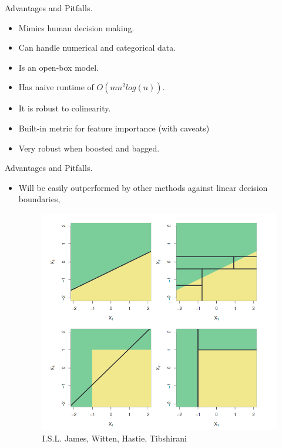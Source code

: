 \documentclass[xcolor={svgnames},
               hyperref={colorlinks,citecolor=DeepPink4,linkcolor=FireBrick,urlcolor=Maroon}]
               {beamer}
\begin{document}
  \begin{frame}{Advantages and Pitfalls.}
    \begin{itemize}
      \item Mimics human decision making. 
      \vfill
      \item Can handle numerical and categorical data.
      \vfill
      \item Is an open-box model.
      \vfill
      \item Has naive runtime of $O(mn^2log(n))$. 
      \vfill
      \item It is robust to colinearity.
      \vfill
      \item Built-in metric for feature importance (with caveats)
      \vfill
      \item Very robust when boosted and bagged.
    \end{itemize}
  \end{frame}


  \begin{frame}{Advantages and Pitfalls.}
    \begin{itemize}
      \item Will be easily outperformed by other methods against linear decision boundaries,
      \begin{figure}
        \vspace*{\fill}
        \begin{center}
      \includegraphics[width=.50\textwidth]{LinearBoudary.png}
        \end{center}
        \caption{I.S.L. James, Witten, Hastie, Tibshirani}
        \vspace*{\fill}
      \end{figure}
    \end{itemize}
  \end{frame}
\end{document}
